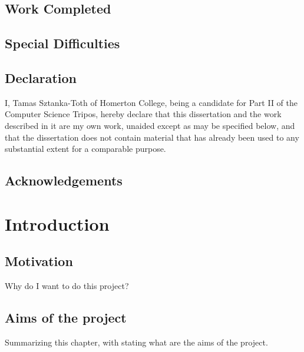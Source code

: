 \documentclass[12pt,twoside,notitlepage]{report}
\begin{document}
\section*{Work Completed}

\section*{Special Difficulties}
 
\newpage
\section*{Declaration}

I, Tamas Sztanka-Toth of Homerton College, being a candidate for Part II of the Computer
Science Tripos, hereby declare
that this dissertation and the work described in it are my own work,
unaided except as may be specified below, and that the dissertation
does not contain material that has already been used to any substantial
extent for a comparable purpose.

\bigskip
{}

\medskip
{}

\cleardoublepage

\tableofcontents

\listoffigures

\newpage
\section*{Acknowledgements}



\cleardoublepage        %

\setcounter{page}{1}
\pagestyle{headings}

\chapter{Introduction}
\section{Motivation}
Why do I want to do this project?
\section{Aims of the project}
Summarizing this chapter, with stating what are the aims of the project.
\cleardoublepage
\end{document}
